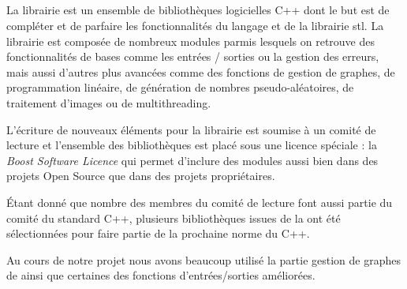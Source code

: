 
%


\subparagraph{}
La librairie \boost  est un ensemble de biblioth\`eques logicielles C++ dont le but est de compléter et de parfaire les fonctionnalités du langage et de la librairie stl. La librairie \boost est compos\'ee de nombreux modules parmis lesquels on retrouve des fonctionnalit\'es de bases comme les entr\'ees / sorties ou la gestion des erreurs, mais aussi d'autres plus avanc\'ees comme des fonctions de gestion de graphes, de programmation lin\'eaire, de g\'en\'eration de nombres pseudo-al\'eatoires, de traitement d'images ou de multithreading.
\par
L'\'ecriture de nouveaux \'el\'ements pour la librairie \boost est soumise \`a un  comit\'e de lecture et l'ensemble des biblioth\`eques est plac\'e sous une licence sp\'eciale : la \textit{Boost Software Licence} qui permet d'inclure des modules \boost aussi bien dans des projets Open Source que dans des projets propri\'etaires.
\par
\'Etant donn\'e que nombre des membres du comit\'e de lecture font aussi partie du comit\'e du standard C++, plusieurs biblioth\`eques issues de la \boost ont \'et\'e s\'electionn\'ees pour faire partie de la prochaine norme du C++.
\par
Au cours de notre projet nous avons beaucoup utilis\'e la partie gestion de graphes de \boost ainsi que certaines des fonctions d'entr\'ees/sorties am\'elior\'ees.
%
